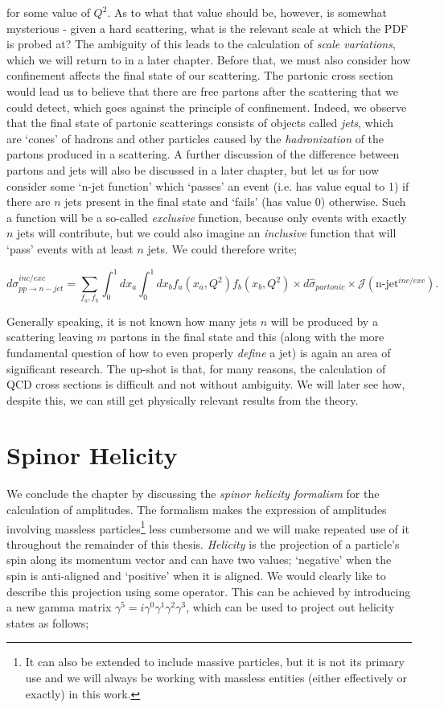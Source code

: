 for some value of $Q^2$. As to what that value should be, however, is somewhat mysterious - given a hard scattering, what is the relevant scale at which the PDF is probed at? The ambiguity of this leads to the calculation of \emph{scale variations}, which we will return to in a later chapter. Before that, we must also consider how confinement affects the final state of our scattering. The partonic cross section would lead us to believe that there are free partons after the scattering that we could detect, which goes against the principle of confinement. Indeed, we observe that the final state of partonic scatterings consists of objects called \emph{jets}, which are `cones' of hadrons and other particles caused by the \emph{hadronization} of the partons produced in a scattering. A further discussion of the difference between partons and jets will also be discussed in a later chapter, but let us for now consider some `n-jet function' which `passes' an event (i.e. has value equal to 1) if there are $n$ jets present in the final state and `fails' (has value 0) otherwise. Such a function will be a so-called \emph{exclusive} function, because only events with exactly $n$ jets will contribute, but we could also imagine an \emph{inclusive} function that will `pass' events with at least $n$ jets. We could therefore write;

\begin{equation}
d \sigma_{pp \to n-jet}^{inc/exc} = \sum_{f_a, f_b} \int_0^1 dx_a \int_0^1 dx_b f_a(x_a, Q^2) f_b(x_b, Q^2) \times d\hat{\sigma}_{partonic} \times \mathcal{J}(\text{n-jet}^{inc/exc}).
\end{equation}

Generally speaking, it is not known how many jets $n$ will be produced by a scattering leaving $m$ partons in the final state and this (along with the more fundamental question of how to even properly \emph{define} a jet) is again an area of significant research. The up-shot is that, for many reasons, the calculation of QCD cross sections is difficult and not without ambiguity. We will later see how, despite this, we can still get physically relevant results from the theory. 

\section{Spinor Helicity}
We conclude the chapter by discussing the \emph{spinor helicity formalism} for the calculation of amplitudes. The formalism makes the expression of amplitudes involving massless particles\footnote{It can also be extended to include massive particles, but it is not its primary use and we will always be working with massless entities (either effectively or exactly) in this work.} less cumbersome and we will make repeated use of it throughout the remainder of this thesis. \emph{Helicity} is the projection of a particle's spin along its momentum vector and can have two values; `negative' when the spin is anti-aligned and `positive' when it is aligned. We would clearly like to describe this projection using some operator. This can be achieved by introducing a new gamma matrix $\gamma^5 = i \gamma^0 \gamma^1 \gamma^2 \gamma^3$, which can be used to project out helicity states as follows;

